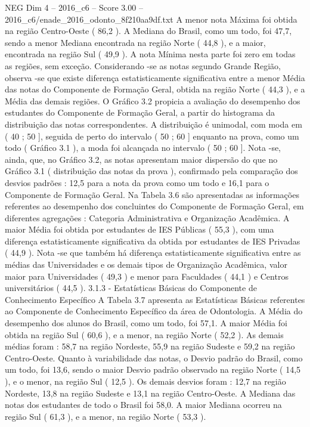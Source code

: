 \begin{textsample}{NEG Dim 4 – 2016\_c6 – Score 3.00 – 2016\_c6/enade\_2016\_odonto\_8f210aa9df.txt}
A menor nota Máxima foi obtida na região Centro-Oeste ( 86,2 ).
A Mediana do Brasil, como um todo, foi 47,7, sendo a menor Mediana encontrada na região Norte ( 44,8 ), e a maior, encontrada na região Sul ( 49,9 ).
A nota Mínima nesta parte foi zero em todas as regiões, sem exceção.
Considerando -se as notas segundo Grande Região, observa -se que existe diferença estatisticamente significativa entre a menor Média das notas do Componente de Formação Geral, obtida na região Norte ( 44,3 ), e a Média das demais regiões.
O Gráfico 3.2 propicia a avaliação do desempenho dos estudantes do Componente de Formação Geral, a partir do histograma da distribuição das notas correspondentes.
A distribuição é unimodal, com moda em ( 40 ; 50 ], seguida de perto do intervalo ( 50 ; 60 ] enquanto na prova, como um todo ( Gráfico 3.1 ), a moda foi alcançada no intervalo ( 50 ; 60 ].
Nota -se, ainda, que, no Gráfico 3.2, as notas apresentam maior dispersão do que no Gráfico 3.1 ( distribuição das notas da prova ), confirmado pela comparação dos desvios padrões : 12,5 para a nota da prova como um todo e 16,1 para o Componente de Formação Geral.
Na Tabela 3.6 são apresentadas as informações referentes ao desempenho dos concluintes do Componente de Formação Geral, em diferentes agregações : Categoria Administrativa e Organização Acadêmica.
A maior Média foi obtida por estudantes de IES Públicas ( 55,3 ), com uma diferença estatisticamente significativa da obtida por estudantes de IES Privadas ( 44,9 ).
Nota -se que também há diferença estatisticamente significativa entre as médias das Universidades e os demais tipos de Organização Acadêmica, valor maior para Universidades ( 49,3 ) e menor para Faculdades ( 44,1 ) e Centros universitários ( 44,5 ). 3.1.3 - Estatísticas Básicas do Componente de Conhecimento Específico A Tabela 3.7 apresenta as Estatísticas Básicas referentes ao Componente de Conhecimento Específico da área de Odontologia.
A Média do desempenho dos alunos do Brasil, como um todo, foi 57,1.
A maior Média foi obtida na região Sul ( 60,6 ), e a menor, na região Norte ( 52,2 ).
As demais médias foram : 58,7 na região Nordeste, 55,9 na região Sudeste e 59,2 na região Centro-Oeste.
Quanto à variabilidade das notas, o Desvio padrão do Brasil, como um todo, foi 13,6, sendo o maior Desvio padrão observado na região Norte ( 14,5 ), e o menor, na região Sul ( 12,5 ).
Os demais desvios foram : 12,7 na região Nordeste, 13,8 na região Sudeste e 13,1 na região Centro-Oeste.
A Mediana das notas dos estudantes de todo o Brasil foi 58,0.
A maior Mediana ocorreu na região Sul ( 61,3 ), e a menor, na região Norte ( 53,3 ).

\end{textsample}
